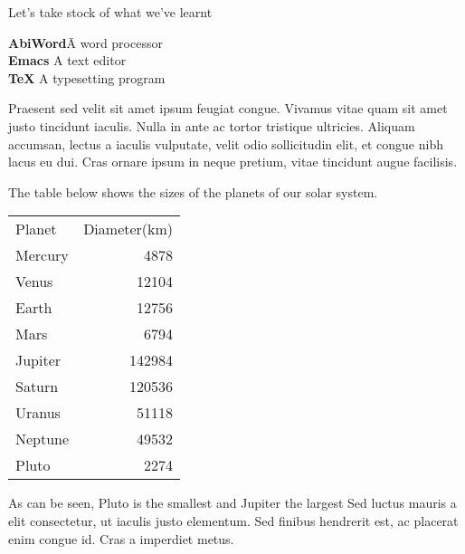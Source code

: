 \documentclass{article}
\begin{document}
Let’s take stock of what we’ve learnt
\begin{tabbing}
\hspace{1cm}\= \textbf{AbiWord}\quad\= A word processor\\[5pt]
\> \textbf{Emacs} \> A text editor\\[5pt]
\> \textbf{\TeX} \> A typesetting program
\end{tabbing}

Praesent sed velit sit amet ipsum feugiat congue. Vivamus vitae quam sit amet
justo tincidunt iaculis. Nulla in ante ac tortor tristique ultricies.
Aliquam accumsan, lectus a iaculis vulputate, velit odio sollicitudin elit, et
congue nibh lacus eu dui. Cras ornare ipsum in neque pretium, vitae tincidunt
augue facilisis.

The table below shows the sizes of the planets of our solar system.
\begin{center}
\begin{tabular}{lr}
Planet & Diameter(km)\\[5pt]
Mercury & 4878\\
Venus & 12104\\
Earth & 12756\\
Mars & 6794\\
Jupiter & 142984\\
Saturn & 120536\\
Uranus & 51118\\
Neptune & 49532\\
Pluto & 2274
\end{tabular}
\end{center}

As can be seen, Pluto is the smallest and Jupiter the largest
Sed luctus mauris a elit consectetur, ut iaculis justo elementum.
Sed finibus hendrerit est, ac placerat enim congue id. Cras a imperdiet metus.
\end{document}
